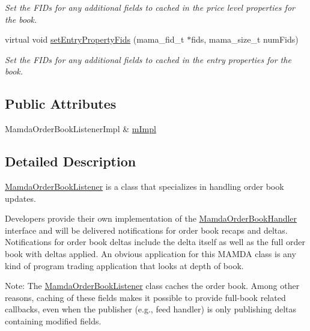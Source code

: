 \begin{CompactItemize}
\begin{CompactList}\small\item\em Set the FIDs for any additional fields to cached in the price level properties for the book. \item\end{CompactList}\item 
virtual void \hyperlink{classWombat_1_1MamdaOrderBookListener_33244f9f7e6a9d1afe530669ecc39ea0}{set\-Entry\-Property\-Fids} (mama\_\-fid\_\-t $\ast$fids, mama\_\-size\_\-t num\-Fids)
\begin{CompactList}\small\item\em Set the FIDs for any additional fields to cached in the entry properties for the book. \item\end{CompactList}\end{CompactItemize}
\subsection*{Public Attributes}
\begin{CompactItemize}
\item 
Mamda\-Order\-Book\-Listener\-Impl \& \hyperlink{classWombat_1_1MamdaOrderBookListener_ace34a93d0a027b656d45d68bbf9748d}{m\-Impl}
\end{CompactItemize}


\subsection{Detailed Description}
\hyperlink{classWombat_1_1MamdaOrderBookListener}{Mamda\-Order\-Book\-Listener} is a class that specializes in handling order book updates. 

Developers provide their own implementation of the \hyperlink{classWombat_1_1MamdaOrderBookHandler}{Mamda\-Order\-Book\-Handler} interface and will be delivered notifications for order book recaps and deltas. Notifications for order book deltas include the delta itself as well as the full order book with deltas applied. An obvious application for this MAMDA class is any kind of program trading application that looks at depth of book.

Note: The \hyperlink{classWombat_1_1MamdaOrderBookListener}{Mamda\-Order\-Book\-Listener} class caches the order book. Among other reasons, caching of these fields makes it possible to provide full-book related callbacks, even when the publisher (e.g., feed handler) is only publishing deltas containing modified fields. 



